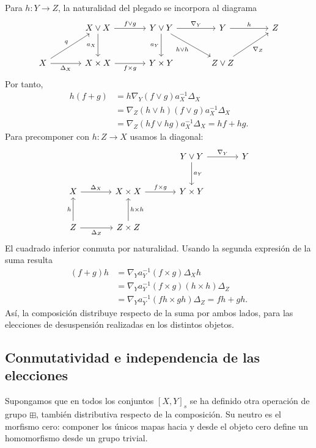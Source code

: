 Para $h\colon Y\to Z$, la naturalidad del plegado se incorpora al diagrama
\[
\begin{tikzcd}[column sep=large,row sep=large]
&X\vee X\arrow[r,"f\vee g"]\arrow[d,"a_X"']
&Y\vee Y\arrow[r,"\nabla_Y"]\arrow[d,"a_Y"']\arrow[dr,"h\vee h"']
&Y\arrow[r,"h"]&Z\\
X\arrow[ur,"q"]\arrow[r,"\Delta_X"']&X\times X\arrow[r,"f\times g"']
&Y\times Y&Z\vee Z\arrow[ur,"\nabla_Z"']&
\end{tikzcd}
\]
Por tanto,
\[
\begin{aligned}
h(f+g)&=h\nabla_Y(f\vee g)a_X^{-1}\Delta_X\\
&=\nabla_Z(h\vee h)(f\vee g)a_X^{-1}\Delta_X\\
&=\nabla_Z(hf\vee hg)a_X^{-1}\Delta_X=hf+hg.
\end{aligned}
\]
Para precomponer con $h\colon Z\to X$ usamos la diagonal:
\[
\begin{tikzcd}[column sep=large,row sep=large]
&&Y\vee Y\arrow[r,"\nabla_Y"]\arrow[d,"a_Y"]&Y\\
X\arrow[r,"\Delta_X"]&X\times X\arrow[r,"f\times g"]&Y\times Y&\\
Z\arrow[u,"h"]\arrow[r,"\Delta_Z"']&Z\times Z\arrow[u,"h\times h"']&&
\end{tikzcd}
\]
El cuadrado inferior conmuta por naturalidad. Usando la segunda expresión de la suma resulta
\[
\begin{aligned}
(f+g)h&=\nabla_Ya_Y^{-1}(f\times g)\Delta_Xh\\
&=\nabla_Ya_Y^{-1}(f\times g)(h\times h)\Delta_Z\\
&=\nabla_Ya_Y^{-1}(fh\times gh)\Delta_Z=fh+gh.
\end{aligned}
\]
Así, la composición distribuye respecto de la suma por ambos lados, para las elecciones de desuspensión realizadas en los distintos objetos.

\subsection{Conmutatividad e independencia de las elecciones}

Supongamos que en todos los conjuntos $[X,Y]_s$ se ha definido otra operación de grupo $\boxplus$, también distributiva respecto de la composición. Su neutro es el morfismo cero: componer los únicos mapas hacia y desde el objeto cero define un homomorfismo desde un grupo trivial.

